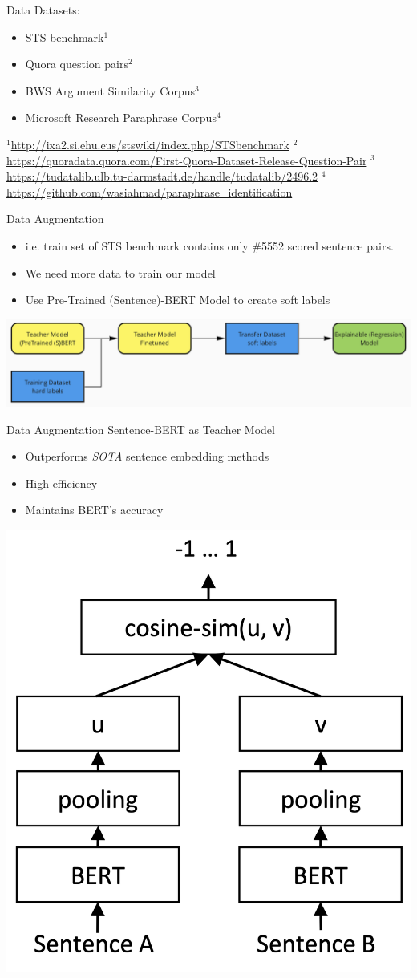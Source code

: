 \documentclass[10pt, compress]{beamer}
\begin{document}
\begin{frame}{Data}
Datasets:
\begin{itemize}
	\item STS benchmark$^1$
	\item Quora question pairs$^2$
	\item BWS Argument Similarity Corpus$^3$
	\item Microsoft Research Paraphrase Corpus$^4$
\end{itemize}
\vfill{}
{\tiny
$^1$\url{http://ixa2.si.ehu.eus/stswiki/index.php/STSbenchmark}
$^2$\url{https://quoradata.quora.com/First-Quora-Dataset-Release-Question-Pair}
$^3$\url{https://tudatalib.ulb.tu-darmstadt.de/handle/tudatalib/2496.2}
$^4$\url{https://github.com/wasiahmad/paraphrase_identification}
}
\end{frame}


\begin{frame}{Data Augmentation}
\begin{itemize}
	\item i.e. train set of STS benchmark contains only \#5552 scored sentence pairs.
	\item We need more data to train our model
	\item Use Pre-Trained (Sentence)-BERT Model to create soft labels
\end{itemize}
\vfill
\includegraphics[width=\textwidth]{gfx/DataAugmentation}
\end{frame}


\begin{frame}[t]{Data Augmentation}
Sentence-BERT as Teacher Model
\begin{itemize}
	\item Outperforms \textit{SOTA} sentence embedding methods
	\item High efficiency
	\item Maintains BERT's accuracy
\end{itemize}
\vspace{-1cm}\raggedleft
\includegraphics[width=.4\textwidth]{gfx/SBERT}\\
\tiny{\cite{DBLP:journals/corr/abs-1908-10084}}
\end{frame}
\end{document}
